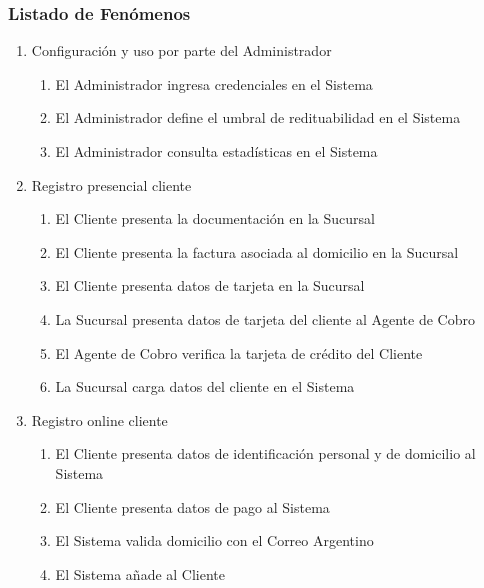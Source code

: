 \subsubsection{Listado de Fenómenos}
\begin{enumerate}
 \item Configuración y uso por parte del Administrador
  \begin{enumerate}
   \item El Administrador ingresa credenciales en el Sistema
   \item El Administrador define el umbral de redituabilidad en el Sistema
   \item El Administrador consulta estadísticas en el Sistema
  \end{enumerate}

 \item Registro presencial cliente
  \begin{enumerate}
      \item El Cliente presenta la documentación en la Sucursal
      \item El Cliente presenta la factura asociada al domicilio en la Sucursal
      \item El Cliente presenta datos de tarjeta en la Sucursal
      \item La Sucursal presenta datos de tarjeta del cliente al Agente de Cobro
      \item El Agente de Cobro verifica la tarjeta de crédito del Cliente %
      \item La Sucursal carga datos del cliente en el Sistema
  \end{enumerate}
  
 \item Registro online cliente
  \begin{enumerate}
    \item El Cliente presenta datos de identificación personal y de domicilio al Sistema
    \item El Cliente presenta datos de pago al Sistema
    \item El Sistema valida domicilio con el Correo Argentino
    \item El Sistema añade al Cliente
  \end{enumerate}
  

\end{enumerate}
